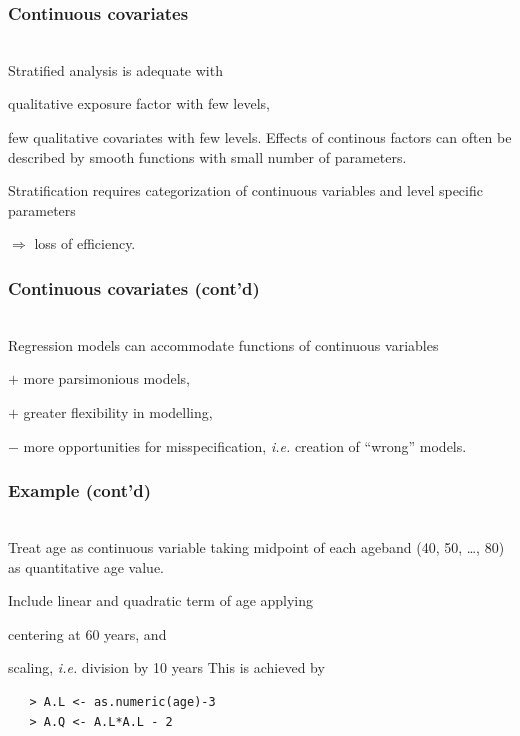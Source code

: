 \documentclass[handout, 12pt]{beamer}
\begin{document}

\begin{frame}[fragile] \frametitle{Continuous covariates}
\ \\ 
Stratified analysis is adequate with
\bi
\item qualitative exposure factor with few levels,
\item few qualitative covariates with few levels.
\ei
Effects of continous factors can often be 
described by smooth functions with small number of parameters.

Stratification requires categorization of 
continuous variables and level specific parameters 

$\Rightarrow$ loss of efficiency.
\end{frame} 


\begin{frame}[fragile] \frametitle{Continuous covariates (cont'd)}
\ \\
Regression models can accommodate functions of 
continuous variables 
\bi
\item[$+$] more parsimonious models, \medskip 
\item[$+$] greater flexibility in modelling, \medskip
\item[$-$] more opportunities for misspecification,
{\it i.e.} creation of ``wrong'' 
models.
\ei
\end{frame} 


\begin{frame}[fragile] \frametitle{Example (cont'd)}
\ \\
Treat age as continuous variable taking midpoint of each ageband
(40, 50, \dots, 80)
as quantitative age value. 

Include linear and quadratic term of age applying 
\bi
\item centering at 60 years, and 
\item scaling, \textit{i.e.} division by 10 years
\ei
This is achieved by
\small
\begin{verbatim}
   > A.L <- as.numeric(age)-3 
   > A.Q <- A.L*A.L - 2
\end{verbatim}
\normalsize   
\end{frame} 


\end{document}
